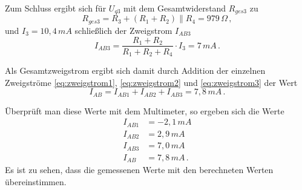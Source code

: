Zum Schluss ergibt sich für $U_{q3}$ mit dem Gesamtwiderstand $R_{ges3}$ zu
\begin{equation*}
    R_{ges3}=R_3+(R_1+R_2)\parallel{R_4}=979\,\Omega\, ,
\end{equation*} und $I_{3}=10,4\,mA$ schließlich der Zweigstrom $I_{AB3}$
\begin{equation}
    \label{eq:zweigstrom3}
    I_{AB3}=\frac{R_1+R_2}{R_1+R_2+R_4}\cdot I_{3}=7\,mA\, .
\end{equation}

Als Gesamtzweigstrom ergibt sich damit durch Addition der einzelnen Zweigströme {\eqref{eq:zweigstrom1}}, {\eqref{eq:zweigstrom2}} und {\eqref{eq:zweigstrom3}} der Wert
\begin{equation*}
    I_{AB}=I_{AB1}+I_{AB2}+I_{AB3}=7,8\,mA\, .
\end{equation*}

Überprüft man diese Werte mit dem Multimeter, so ergeben sich die Werte
\begin{align*}
    I_{AB1} & = -2,1\,mA    \\
    I_{AB2} & = 2,9\,mA     \\
    I_{AB3} & = 7,0\,mA     \\
    I_{AB}  & = 7,8\,mA\, .
\end{align*}
Es ist zu sehen, dass die gemessenen Werte mit den berechneten Werten übereinstimmen.




